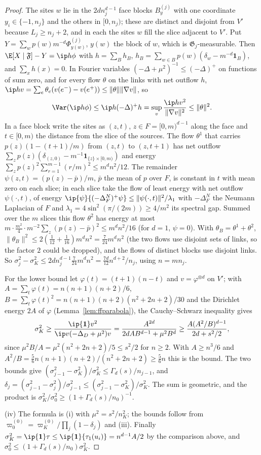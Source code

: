 \begin{proof}
The sites $w$ lie in the $2dn_j^{d-1}$ face blocks $B^{(j)}_y$ with one
coordinate $y_i\in\{-1,n_j\}$ and the others in $[0,n_j)$; these are
distinct and disjoint from $V'$ because $L_j\ge n_j+2$, and in each the
sites $w$ fill the slice adjacent to $V'$. Put $Y=\sum_wp(w)m^{-d}
\Phi^{(j)}_{y(w)}$, $y(w)$ the block of $w$, which is $\mathfrak
G_j$-measurable. Then $\E[X\mid\mathfrak F]-Y=\ip h\phi$ with $h=\sum_Bh_B$,
$h_B=\sum_{w\in B}p(w)(\delta_w-m^{-d}\mathbf 1_B)$, and $\sum_xh(x)=0$. In
Fourier variables $(-\Delta+\mu^2)^{-1}\le(-\Delta)^{+}$ on functions of sum
zero, and for every flow $\theta$ on the links with net outflow $h$,
$\ip hv=\sum_e\theta_e(v(e^-)-v(e^+))\le\lVert\theta\rVert\lVert\nabla v
\rVert$, so
\[
\Var(\ip h\phi)\le\ip h{(-\Delta)^+h}=\sup_v\frac{\ip hv^2}{\lVert\nabla v
\rVert^2}\le\lVert\theta\rVert^2 .
\]
In a face block write the sites as $(z,t)$, $z\in F=[0,m)^{d-1}$ along the
face and $t\in[0,m)$ the distance from the slice of the sources. The flow
$\theta^1$ that carries $p(z)(1-(t+1)/m)$ from $(z,t)$ to $(z,t+1)$ has net
outflow $\sum_zp(z)(\delta_{(z,0)}-m^{-1}\mathbf 1_{\{z\}\times[0,m)})$ and
energy $\sum_zp(z)^2\sum_{r=1}^{m-1}(r/m)^2\le m^dn^2/12$. The remainder
$\psi(z,t)=(p(z)-\bar p)/m$, $\bar p$ the mean of $p$ over $F$, is constant
in $t$ with mean zero on each slice; in each slice take the flow of least
energy with net outflow $\psi(\cdot,t)$, of energy $\ip{\psi}{(-\Delta^N_F)
^+\psi}\le\lVert\psi(\cdot,t)\rVert^2/\lambda_1$ with $-\Delta^N_F$ the
Neumann Laplacian of $F$ and $\lambda_1=4\sin^2(\pi/(2m))\ge4/m^2$ its
spectral gap. Summed over the $m$ slices this flow $\theta^2$ has energy at
most $m\cdot\frac{m^2}4\cdot m^{-2}\sum_z(p(z)-\bar p)^2\le m^dn^2/16$ (for
$d=1$, $\psi=0$). With $\theta_B=\theta^1+\theta^2$, $\lVert\theta_B
\rVert^2\le2(\frac1{12}+\frac1{16})m^dn^2=\frac7{24}m^dn^2$ (the two flows
use disjoint sets of links, so the factor $2$ could be dropped), and the
flows of distinct blocks use disjoint links. So $\sigma_j^2-\sigma_K^2\le2dn_j^{d-1}
\frac7{24}m^dn^2=\frac{7d}{12}n^{d+2}/n_j$, using $n=mn_j$.

For the lower bound let $\varphi(t)=(t+1)(n-t)$ and $v=\varphi^{\otimes d}$
on $V'$; with $A=\sum_t\varphi(t)=n(n+1)(n+2)/6$, $B=\sum_t\varphi(t)^2=
n(n+1)(n+2)(n^2+2n+2)/30$ and the Dirichlet energy $2A$ of $\varphi$
(Lemma~\ref{lem:ffparabola}), the Cauchy--Schwarz inequality gives
\[
\sigma_K^2\ge\frac{\ip{\mathbf 1}v^2}{\ip v{(-\Delta_D+\mu^2)v}}=\frac{A^{2d}}
{2dAB^{d-1}+\mu^2B^d}\ge\frac{A(A^2/B)^{d-1}}{2d+s^2/2},
\]
since $\mu^2B/A=\mu^2(n^2+2n+2)/5\le s^2/2$ for $n\ge2$. With $A\ge n^3/6$
and $A^2/B=\frac56n(n+1)(n+2)/(n^2+2n+2)\ge\frac56n$ this is the bound. The
two bounds give $(\sigma_{j-1}^2-\sigma_K^2)/\sigma_K^2\le\Gamma_d(s)/
n_{j-1}$, and $\delta_j=(\sigma_{j-1}^2-\sigma_j^2)/\sigma_{j-1}^2\le(\sigma
_{j-1}^2-\sigma_K^2)/\sigma_K^2$. The sum is geometric, and the product is
$\sigma_K^2/\sigma_0^2\ge(1+\Gamma_d(s)/n_0)^{-1}$.

(iv) The formula is (i) with $\mu^2=s^2/n_K^2$; the bounds follow from
$\varpi^{(0)}_0=\varpi^{(0)}_K/\prod_j(1-\delta_j)$ and (iii). Finally
$\sigma_K^2=\ip{\mathbf 1}\tau\le\ip{\mathbf 1}{\tau_1(u_i)}=n^{d-1}A/2$ by the
comparison above, and $\sigma_0^2\le(1+\Gamma_d(s)/n_0)\sigma_K^2$.
\end{proof}
